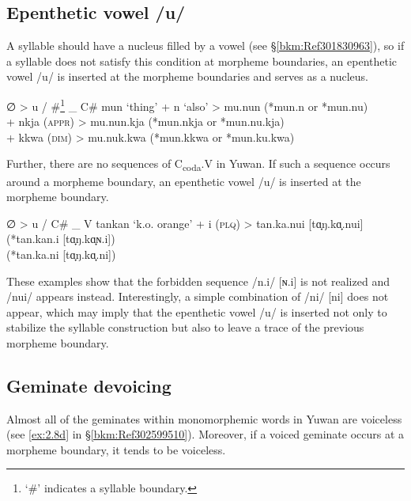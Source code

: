\subsection{Epenthetic vowel /u/}
\label{bkm:Ref301838720}\hypertarget{RefHeadingToc395696980}{}\label{bkm:Ref347173344}
A syllable should have a nucleus filled by a vowel (see §\ref{bkm:Ref301830963}), so if a syllable does not satisfy this condition at morpheme boundaries, an epenthetic vowel /u/ is inserted at the morpheme boundaries and serves as a nucleus.

\ea  ∅   >   u   /   \#\footnote{‘\#’ indicates a syllable boundary.}   \_   C\#
\ex
\ea  mun   ‘thing’   +   n   ‘also’   >   mu.nun   (*mun.n or *mun.nu)\\
\ex  +   nkja   (\textsc{appr})   >   mu.nun.kja   (*mun.nkja or *mun.nu.kja)\\
\ex  +   kkwa   (\textsc{dim})   >   mu.nuk.kwa   (*mun.kkwa or *mun.ku.kwa)\\
\z
\z

Further, there are no sequences of C\textsubscript{coda}.V in Yuwan. If such a sequence occurs around a morpheme boundary, an epenthetic vowel /u/ is inserted at the morpheme boundary.

\ea   ∅   >   u   /   C\#   \_   V
\ex  \gll tankan   ‘k.o. orange’   +   i   (\textsc{plq})   >   tan.ka.nui [tɑ̟ŋ.kɑ̟.nui]   (*tan.kan.i [tɑ̟ŋ.kɑ̟ɴ.i])\\
           {}         {}           {}  {}  {}      {}    {}          {}          (*tan.ka.ni [tɑ̟ŋ.kɑ̟.ni])\\
\z

These examples show that the forbidden sequence /n.i/ [ɴ.i] is not realized and /nui/ appears instead. Interestingly, a simple combination of /ni/ [ni] does not appear, which may imply that the epenthetic vowel /u/ is inserted not only to stabilize the syllable construction but also to leave a trace of the previous morpheme boundary.

\subsection{Geminate devoicing}
\label{bkm:Ref347178914}\hypertarget{RefHeadingToc395696981}{}
Almost all of the geminates within monomorphemic words in Yuwan are voiceless (see \ref{ex:2.8d} in §\ref{bkm:Ref302599510}). Moreover, if a voiced geminate occurs at a morpheme boundary, it tends to be voiceless.

